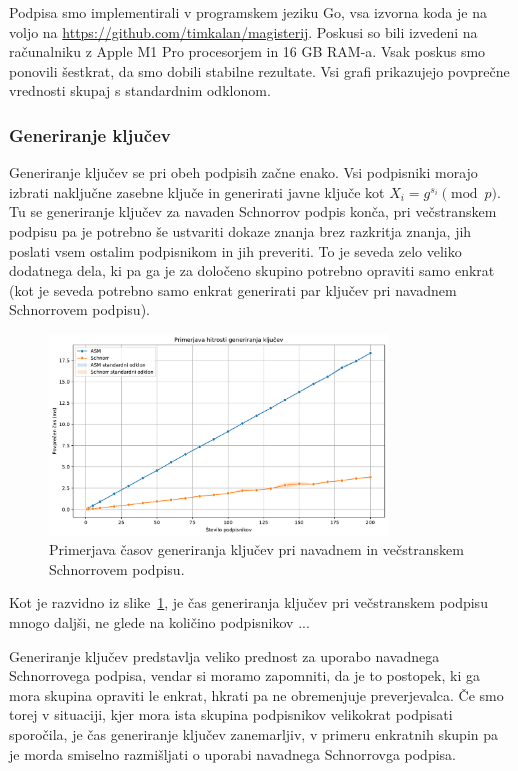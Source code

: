 \documentclass[isrm2, tisk]{fmfdelo}
\begin{document}
Podpisa smo implementirali v programskem jeziku Go, vsa izvorna koda je na voljo na
\href{https://github.com/timkalan/magisterij}{https://github.com/timkalan/magisterij}. Poskusi so
bili izvedeni na računalniku z Apple M1 Pro procesorjem in 16 GB RAM-a. Vsak poskus smo ponovili
šestkrat, da smo dobili stabilne rezultate. Vsi grafi prikazujejo povprečne vrednosti skupaj s
standardnim odklonom.

\subsubsection{Generiranje ključev}
Generiranje ključev se pri obeh podpisih začne enako. Vsi podpisniki morajo izbrati naključne zasebne
ključe in generirati javne ključe kot $X_i = g^{s_i} \pmod p$. Tu se generiranje ključev za navaden
Schnorrov podpis konča, pri večstranskem podpisu pa je potrebno še ustvariti dokaze znanja brez
razkritja znanja, jih poslati vsem ostalim podpisnikom in jih preveriti. To je seveda zelo veliko
dodatnega dela, ki pa ga je za določeno skupino potrebno opraviti samo enkrat (kot je seveda potrebno
samo enkrat generirati par ključev pri navadnem Schnorrovem podpisu).

\begin{figure}[ht]
  \centering
  \includegraphics[width=0.8\textwidth]{images/benchmark_KeyGeneration.pdf}
  \caption[Generiranje ključev.]{Primerjava časov generiranja ključev pri navadnem in večstranskem
    Schnorrovem podpisu.}
  \label{fig:generiranje}
\end{figure}

Kot je razvidno iz slike~\ref{fig:generiranje}, je čas generiranja ključev pri večstranskem podpisu
mnogo daljši, ne glede na količino podpisnikov ... 

Generiranje ključev predstavlja veliko prednost za uporabo navadnega Schnorrovega podpisa, vendar
si moramo zapomniti, da je to postopek, ki ga mora skupina opraviti le enkrat, hkrati pa ne obremenjuje
preverjevalca. Če smo torej v situaciji, kjer mora ista skupina podpisnikov velikokrat podpisati
sporočila, je čas generiranje ključev zanemarljiv, v primeru enkratnih skupin pa je morda smiselno
razmišljati o uporabi navadnega Schnorrovga podpisa.
\end{document}
